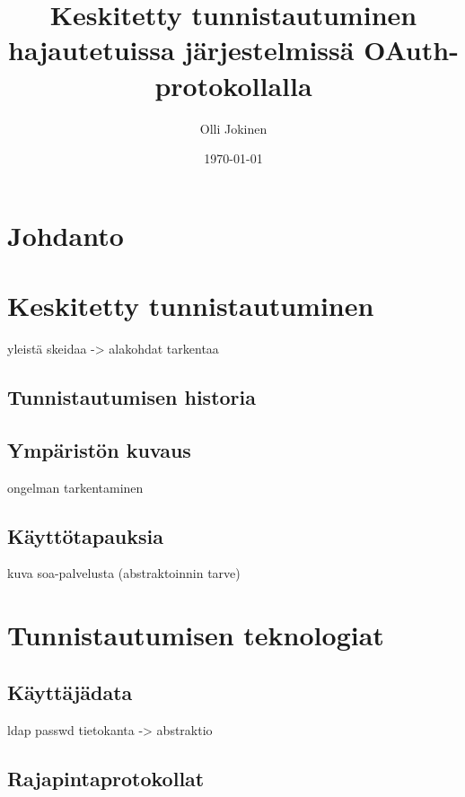 \documentclass{tktltiki}
\begin{document}
\title{Keskitetty tunnistautuminen hajautetuissa järjestelmissä OAuth-protokollalla}
\author{Olli Jokinen}
\date{\today}
\maketitle
\doublespacing
{}
\subject{Tietojenkäsittelytiede}
\additionalinformation{}
\begin{abstract}

\end{abstract}
\mytableofcontents
\section{Johdanto}

\section{Keskitetty tunnistautuminen}
yleistä skeidaa -> alakohdat tarkentaa
\subsection{Tunnistautumisen historia}
\subsection{Ympäristön kuvaus}
ongelman tarkentaminen
\subsection{Käyttötapauksia}
kuva soa-palvelusta (abstraktoinnin tarve)
\section{Tunnistautumisen teknologiat}
\subsection{Käyttäjädata}
ldap
passwd
tietokanta
-> abstraktio
\subsection{Rajapintaprotokollat}
\end{document}
